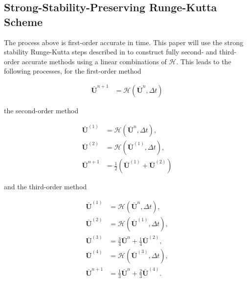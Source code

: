 \documentclass[SingleSpace,12pt,Proceedings]{Serre_ASCE}
\begin{document}
\subsection{Strong-Stability-Preserving Runge-Kutta Scheme} %
The process above is first-order accurate in time. This paper will use the strong stability Runge-Kutta steps described in  to construct fully second- and third-order accurate methods using a linear combinations of $\mathcal{H}$. This leads to the following processes, for the first-order method
\begin{linenomath*}
\begin{align*}
\boldsymbol{\bar{U}}^{n+1} &= \mathcal{H}\left(\boldsymbol{\bar{U}}^{n},\Delta t\right)
\end{align*}
\end{linenomath*}
the second-order method
\begin{linenomath*}
\begin{align*}
\boldsymbol{\bar{U}}^{\left(1\right)} &= \mathcal{H}\left(\boldsymbol{\bar{U}}^{n},\Delta t\right), \\
\boldsymbol{\bar{U}}^{\left(2\right)} &= \mathcal{H}\left(\boldsymbol{\bar{U}}^{\left(1\right)},\Delta t\right), \\
\boldsymbol{\bar{U}}^{n+1} &=\frac{1}{2}\left(\boldsymbol{\bar{U}}^{\left(1\right)} + \boldsymbol{\bar{U}}^{\left(2\right)}  \right)
\end{align*}
\end{linenomath*}
and the third-order method
\begin{linenomath*}
\begin{align*}
\boldsymbol{\bar{U}}^{\left(1\right)} &= \mathcal{H}\left(\boldsymbol{\bar{U}}^{n},\Delta t\right), \\
\boldsymbol{\bar{U}}^{\left(2\right)} &= \mathcal{H}\left(\boldsymbol{\bar{U}}^{\left(1\right)},\Delta t\right), \\
\boldsymbol{\bar{U}}^{\left(3\right)} &= \frac{3}{4}\boldsymbol{\bar{U}}^{n} + \frac{1}{4}\boldsymbol{\bar{U}}^{\left(2\right)} , \\
\boldsymbol{\bar{U}}^{\left(4\right)} &= \mathcal{H}\left(\boldsymbol{\bar{U}}^{\left(3\right)},\Delta t\right), \\
\boldsymbol{\bar{U}}^{n+1} &= \frac{1}{3}\boldsymbol{\bar{U}}^{n} + \frac{2}{3}\boldsymbol{\bar{U}}^{\left(4\right)}.
\end{align*}
\end{linenomath*}
\end{document}
